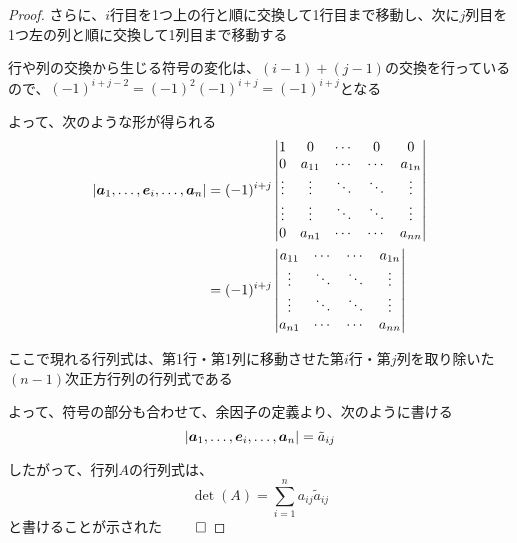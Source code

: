\documentclass[../../../topic_linear-algebra]{subfiles}
\begin{document}
\begin{proof}
  \br

  さらに、$i$行目を1つ上の行と順に交換して1行目まで移動し、次に$j$列目を1つ左の列と順に交換して1列目まで移動する

  \br

  行や列の交換から生じる符号の変化は、$(i-1)+(j-1)$の交換を行っているので、$(-1)^{i+j-2} = (-1)^2(-1)^{i+j} = (-1)^{i+j}$となる

  \br

  よって、次のような形が得られる
  \begin{align*}
    | \vb*{a}_1, \ldots, \vb*{e}_i, \ldots, \vb*{a}_n | & =  (-1)^{i+j} \left| \begin{matrix}
                                                                                 1      & 0      & \cdots & 0      & 0      \\
                                                                                 0      & a_{11} & \cdots & \cdots & a_{1n} \\
                                                                                 \vdots & \vdots & \ddots & \ddots & \vdots \\
                                                                                 \vdots & \vdots & \ddots & \ddots & \vdots \\
                                                                                 0      & a_{n1} & \cdots & \cdots & a_{nn}
                                                                               \end{matrix} \right| \\
                                                        & = (-1)^{i+j} \left| \begin{matrix}
                                                                                a_{11} & \cdots & \cdots & a_{1n} \\
                                                                                \vdots & \ddots & \ddots & \vdots \\
                                                                                \vdots & \ddots & \ddots & \vdots \\
                                                                                a_{n1} & \cdots & \cdots & a_{nn}
                                                                              \end{matrix} \right|
  \end{align*}

  ここで現れる行列式は、第1行・第1列に移動させた第$i$行・第$j$列を取り除いた$(n-1)$次正方行列の行列式である

  よって、符号の部分も合わせて、余因子の定義より、次のように書ける
  \begin{equation*}
    | \vb*{a}_1, \ldots, \vb*{e}_i, \ldots, \vb*{a}_n | = \tilde{a}_{ij}
  \end{equation*}

  したがって、行列$A$の行列式は、
  \begin{equation*}
    \det(A) = \sum_{i=1}^{n} a_{ij} \tilde{a}_{ij}
  \end{equation*}
  と書けることが示された $\qed$
\end{proof}
\end{document}
